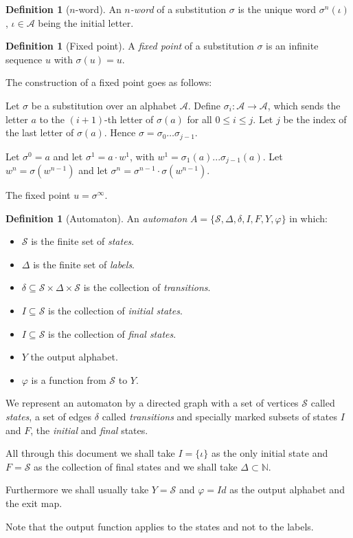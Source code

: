\documentclass{article}
\theoremstyle{definition}
\newtheorem{definition}[theorem]{Definition}
\begin{document}
\begin{definition}[$n$-word] \label{def:n-word}
An \emph{$n$-word} of a substitution $\sigma$ is the unique word 
$\sigma^n(\iota)$, $\iota \in \mathcal{A}$ being the initial letter.

\begin{definition}[Fixed point] \label{def:fixed_point}
A \emph{fixed point} of a substitution $\sigma$ is an infinite sequence $u$ 
with $\sigma(u) = u$.
\end{definition}

The construction of a fixed point goes as follows:

Let $\sigma$ be a substitution over an alphabet $\mathcal{A}$. Define 
$\sigma_i: \mathcal{A \rightarrow A}$, which sends the letter $a$ to the 
$(i + 1)$-th letter of $\sigma(a)$ for all $0 \le i \le j$. Let $j$ be the 
index of the last letter of $\sigma(a)$. Hence 
$\sigma = \sigma_0 \ldots \sigma_{j - 1}$.

Let $\sigma^0 = a$ and let $\sigma^1 = a \cdot w^1$, with 
$w^1 = \sigma_1(a) ... \sigma_{j - 1}(a)$. Let $w^n = \sigma(w^{n - 1})$ and 
let $\sigma^n = \sigma^{n - 1} \cdot \sigma(w^{n - 1})$.

The fixed point $u = \sigma^\infty$.

\begin{definition}[Automaton] \label{def:automaton}
An \emph{automaton} $A = \{\mathcal{S}, \Delta, \delta, I, F, Y, \varphi\}$ in 
which:
\begin{itemize}
\item $\mathcal{S}$ is the finite set of \emph{states}.
\item $\Delta$ is the finite set of \emph{labels}.
\item $\delta \subseteq \mathcal{S} \times \Delta \times \mathcal{S}$ is the
      collection of \emph{transitions}.
\item $I \subseteq \mathcal{S}$ is the collection of \emph{initial states}.
\item $I \subseteq \mathcal{S}$ is the collection of \emph{final states}.
\item $Y$ the output alphabet.
\item $\varphi$ is a function from $\mathcal{S}$ to $Y$.
\end{itemize}
\end{definition}

We represent an automaton by a directed graph with a set of vertices
$\mathcal{S}$ called \emph{states}, a set of edges $\delta$ called
\emph{transitions} and specially marked subsets of states $I$ and $F$, the
\emph{initial} and \emph{final} states.

All through this document we shall take $I = \{\iota\}$ as the only initial
state and $F = \mathcal{S}$ as the collection of final states and we shall
take $\Delta \subset \mathbb{N}$.

Furthermore we shall usually take $Y = \mathcal{S}$ and $\varphi = Id$ as the
output alphabet and the exit map.

Note that the output function applies to the states and not to the labels.
\end{definition}
\end{document}
